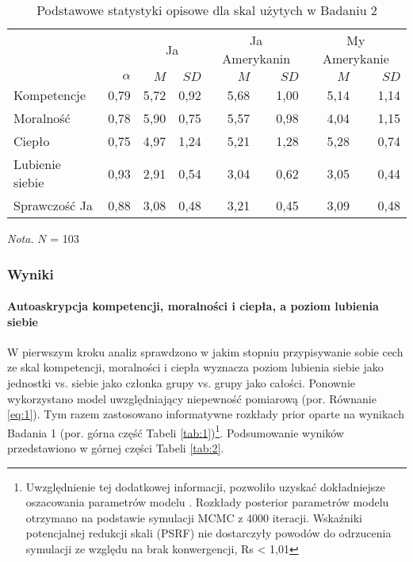 \documentclass[man]{apa6}
\begin{document}
\begin{table*}[htbp]
\vspace*{2em}
\centering
\begin{threeparttable}
\caption{Podstawowe statystyki opisowe dla skal użytych w Badaniu 2}
\label{tab:02}

\begin{tabular}{lrrrrrrr}

\midrule
\multicolumn{2}{c}{ } & \multicolumn{2}{c}{Ja} & \multicolumn{2}{c}{Ja Amerykanin} & \multicolumn{2}{c}{My Amerykanie} \\
\cline{3-8}
& $\alpha$ & $M$ & $SD$ & $M$ & $SD$ & $M$ & $SD$ \\
\midrule
Kompetencje & 0,79 & 5,72 & 0,92 & 5,68 & 1,00 & 5,14 & 1,14 \\
Moralność   & 0,78 & 5,90 & 0,75 & 5,57 & 0,98 & 4,04 & 1,15 \\
Ciepło      & 0,75 & 4,97 & 1,24 & 5,21 & 1,28 & 5,28 & 0,74 \\
Lubienie siebie & 0,93 & 2,91 & 0,54 & 3,04 & 0,62 & 3,05 & 0,44 \\
Sprawczość Ja   & 0,88 & 3,08 & 0,48 & 3,21 & 0,45 & 3,09 & 0,48 \\
\bottomrule

\end{tabular}

\begin{tablenotes}
{\small
\textit{Nota.} $N$ = 103
}
\end{tablenotes}
\end{threeparttable}
\end{table*}

\subsubsection{Wyniki}

\paragraph{Autoaskrypcja kompetencji, moralności i ciepła, a poziom lubienia siebie}

W pierwszym kroku analiz sprawdzono w jakim stopniu przypisywanie sobie cech ze skal kompetencji, moralności i ciepła wyznacza poziom lubienia siebie jako jednostki vs. siebie jako członka grupy vs. grupy jako całości. Ponownie wykorzystano model uwzględniający niepewność pomiarową (por. Równanie \ref{eq:1}). Tym razem zastosowano informatywne rozkłady prior oparte na wynikach Badania 1 (por. górna część Tabeli \ref{tab:1})\footnote{Uwzględnienie tej dodatkowej informacji, pozwoliło uzyskać dokładniejsze oszacowania parametrów modelu \parencite[zob. np.][]{gill2014bayesian}. Rozkłady posterior parametrów modelu otrzymano na podstawie symulacji MCMC z 4000 iteracji. Wskaźniki potencjalnej redukcji skali (PSRF) nie dostarczyły powodów do odrzucenia symulacji ze względu na brak konwergencji, Rs < 1,01}. Podsumowanie wyników przedstawiono w górnej części Tabeli \ref{tab:2}. \\
\end{document}

